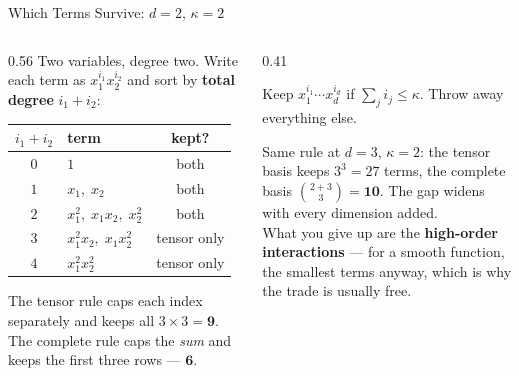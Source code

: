 \begin{frame}{Which Terms Survive: $d=2$, $\kappa=2$}
\begin{columns}[T]
\begin{column}{0.56\textwidth}
\small
Two variables, degree two. Write each term as $x_1^{i_1}x_2^{i_2}$ and sort by \textbf{total degree}
$i_1+i_2$:
\medskip
\begin{center}\footnotesize
\begin{tabularx}{\linewidth}{@{}c >{\raggedright\arraybackslash}X c@{}}
\toprule
$i_1{+}i_2$ & \textbf{term} & \textbf{kept?} \\
\midrule
$0$ & $1$ & both \\
$1$ & $x_1,\;x_2$ & both \\
$2$ & $x_1^{2},\;x_1x_2,\;x_2^{2}$ & both \\
\midrule
$3$ & $x_1^{2}x_2,\;x_1x_2^{2}$ & tensor only \\
$4$ & $x_1^{2}x_2^{2}$ & tensor only \\
\bottomrule
\end{tabularx}
\end{center}
\medskip
The tensor rule caps each index separately and keeps all $3\times3=\mathbf{9}$. The complete rule
caps the \emph{sum} and keeps the first three rows --- $\mathbf{6}$.
\end{column}
\begin{column}{0.41\textwidth}
\begin{conceptbox}[title=\textbf{The rule in one line}]\small
Keep $x_1^{i_1}\cdots x_d^{i_d}$ if $\sum_j i_j\le\kappa$. Throw away everything else.
\end{conceptbox}
\medskip
\begin{examplebox}\footnotesize
Same rule at $d=3$, $\kappa=2$: the tensor basis keeps $3^{3}=27$ terms, the complete basis
$\binom{2+3}{3}=\mathbf{10}$. The gap widens with every dimension added.\\[1mm]
What you give up are the \textbf{high-order interactions} --- for a smooth function, the smallest
terms anyway, which is why the trade is usually free.
\end{examplebox}
\end{column}
\end{columns}
\vspace{1mm}
\end{frame}

